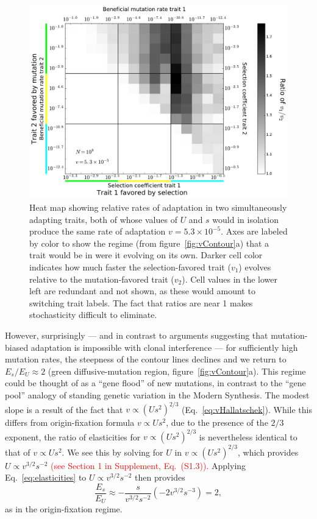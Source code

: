 \documentclass[9pt,twocolumn,twoside]{article}
\begin{document}
\begin{figure}[!ht]
\centering
\includegraphics[scale=.4]{fig_two_trait_compare_v.pdf}
\caption{\label{fig:twotraitcomparison} \small Heat map showing relative rates of adaptation in two simultaneously adapting traits, both of whose values of $U$ and $s$ would in isolation produce the same rate of adaptation $v=5.3\times 10^{-5}$. Axes are labeled by color to show the regime (from figure~\ref{fig:vContour}a) that a trait would be in were it evolving on its own. Darker cell color indicates how much faster the selection-favored trait ($v_1$) evolves relative to the mutation-favored trait ($v_2$). Cell values in the lower left are redundant and not shown, as these would amount to switching trait labels. The fact that ratios are near 1 makes stochasticity difficult to eliminate.}
\end{figure}

However, surprisingly --- and in contrast to arguments suggesting that mutation-biased adaptation is impossible with clonal interference \citep{svensson2019role} --- for sufficiently high mutation rates, the steepness of the contour lines declines and we return to $E_s/E_U \approx 2$ (green diffusive-mutation region, figure~\ref{fig:vContour}a). This regime could be thought of as a ``gene flood'' of new mutations, in contrast to the ``gene pool'' analogy of standing genetic variation in the Modern Synthesis. The modest slope is a result of the fact that $v\propto (Us^2)^{2/3}$ (Eq.~\eqref{eq:vHallatschek}). While this differs from origin-fixation formula $v \propto Us^2$, due to the presence of the $2/3$ exponent, the ratio of elasticities for $v \propto (Us^2)^{2/3}$ is nevertheless identical to that of $v \propto Us^2$. We see this by solving for $U$ in $v \propto (Us^2)^{2/3}$, which provides $U \propto v^{3/2} s^{-2}$ \textcolor{red}{(see Section 1 in Supplement, Eq.~(S1.3)).} Applying Eq.~\eqref{eq:elasticities} to $U \propto v^{3/2} s^{-2}$ then provides 
\[
\frac{E_s}{E_U} \approx -\frac{s}{v^{3/2}s^{-2}} \left(-2v^{3/2}s^{-3}\right) = 2,
\]
as in the origin-fixation regime. 
\end{document}
